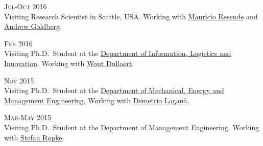 \begin{paracol}{2}
  \textsc{Jul-Oct 2016}
\switchcolumn
  \\
  Visiting Research Scientist in Seattle, USA. Working with \href{https://scholar.google.com/citations?user=KTmPx50AAAAJ}{Mauricio Resende} and \href{https://scholar.google.it/citations?user=U5iFVowAAAAJ}{Andrew Goldberg}.
\end{paracol}

\begin{paracol}{2}
  \textsc{Feb 2016}
\switchcolumn
  \\
  Visiting Ph.D.\ Student at the \href{https://sbe.vu.nl/en/departments-and-institutes/information-logistics-and-innovation/index.aspx}{Department of Information, Logistics and Innovation}. Working with \href{https://scholar.google.com/citations?user=wjjCd5UAAAAJ}{Wout Dullaert}.
\end{paracol}

\begin{paracol}{2}
  \textsc{Nov 2015}
\switchcolumn
  \\
  Visiting Ph.D.\ Student at the \href{http://www.unical.it/portale/strutture/dipartimenti_240/dimeg/}{Department of Mechanical, Energy and Management Engineering}. Working with \href{https://scholar.google.com/citations?user=r_qFOqgAAAAJ}{Demetrio Laganà}.
\end{paracol}

\begin{paracol}{2}
  \textsc{Mar-May 2015}
\switchcolumn
  \\
  Visiting Ph.D.\ Student at the \href{http://www.man.dtu.dk/english}{Department of Management Engineering}. Working with \href{https://scholar.google.com/citations?user=sYi141QAAAAJ}{Stefan Røpke}.
\end{paracol}

%

